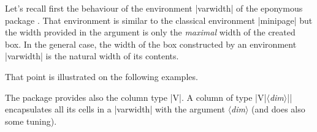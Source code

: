 \documentclass[dvipsnames]{article}%
\begin{document}
\label{varwidth}


Let's recall first the behaviour of the environment |{varwidth}| of the
eponymous package . That environment is similar to the classical
environment |{minipage}| but the width provided in the argument is only the
\emph{maximal} width of the created box. In the general case, the width of the
box constructed by an environment |{varwidth}| is the natural width of its
contents.

\medskip
That point is illustrated on the following examples.

\medskip
\begin{Code}[width=6cm]
\end{Code}

\bigskip
\begin{Code}[width=6cm]
\end{Code}


\bigskip
The package  provides also the column type |V|. A column of type
|V{|$\langle$\textsl{dim}$\rangle$|}| encapsulates all its cells in a
|{varwidth}| with the argument $\langle$\textsl{dim}$\rangle$ (and does also some tuning).
\end{document}
